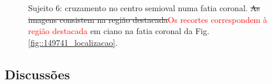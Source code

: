 \begin{figure}[H]
\centering
    \hfill
    \caption{Sujeito 6: cruzamento no centro semioval numa fatia coronal. \sout{As imagens consistem na região destacada}\textcolor{red}{Os recortes correspondem à região destacada} em ciano na fatia coronal da Fig. \ref{fig::149741_localizacao}.
    }
    \label{fig::149741_crossing}
\end{figure}


\subsection{Discussões}
\label{ssec::visual_discussoes}


